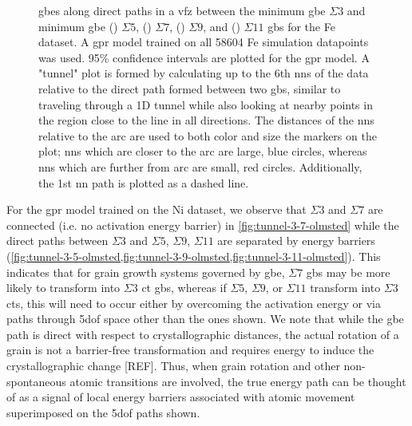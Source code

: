 \documentclass[final,twocolumn,12pt]{elsarticle}
\begin{document}
\begin{figure}[!htb]
\begin{subfigure}[b]{0.4\textwidth}
			\caption{}
			\label{fig:tunnel-3-11-kim}
		\end{subfigure}
		\caption{\Glspl{gbe} along direct paths in a \gls{vfz} between the minimum \gls{gbe} $\Sigma3$  and minimum \gls{gbe} () $\Sigma5$, () $\Sigma7$, () $\Sigma9$, and () $\Sigma11$ \glspl{gb} for the Fe \citet{kimPhasefieldModeling3D2014} dataset. A \gls{gpr} model trained on all \num{58604} Fe \citet{kimPhasefieldModeling3D2014} simulation datapoints was used. 95\% confidence intervals are plotted for the \gls{gpr} model. A "tunnel" plot is formed by calculating up to the 6th \glspl{nn} of the \inpt{} data relative to the direct path formed between two \glspl{gb}, similar to traveling through a 1D tunnel while also looking at nearby points in the region close to the line in all directions. The distances of the \glspl{nn} relative to the arc are used to both color and size the markers on the plot; \glspl{nn} which are closer to the arc are large, blue circles, whereas \glspl{nn} which are further from arc are small, red circles. Additionally, the 1st \gls{nn} path is plotted as a dashed line. }
		\label{fig:sigma-tunnels-kim}
	\end{figure}
	
     For the \gls{gpr} model trained on the Ni \citet{olmstedSurveyComputedGrain2009} dataset, we observe that $\Sigma3$ and $\Sigma7$ are connected (i.e. no activation energy barrier) in \cref{fig:tunnel-3-7-olmsted} while the direct paths between $\Sigma3$ and $\Sigma5$, $\Sigma9$, $\Sigma11$ are separated by energy barriers (\cref{fig:tunnel-3-5-olmsted,fig:tunnel-3-9-olmsted,fig:tunnel-3-11-olmsted}). This indicates that for grain growth systems governed by \gls{gbe}, $\Sigma7$ \glspl{gb} may be more likely to transform into $\Sigma3$ \gls{ct} \glspl{gb}, whereas if $\Sigma5$, $\Sigma9$, or $\Sigma11$ transform into $\Sigma3$ \glspl{ct}, this will need to occur either by overcoming the activation energy or via paths through \gls{5dof} space other than the ones shown.  We note that while the \gls{gbe} path is direct with respect to crystallographic distances, the actual rotation of a grain is not a barrier-free transformation and requires energy to induce the crystallographic change [REF]. Thus, when grain rotation and other non-spontaneous atomic transitions are involved, the true energy path can be thought of as a signal of local energy barriers associated with atomic movement superimposed on the \gls{5dof} paths shown.
     
\end{document}
